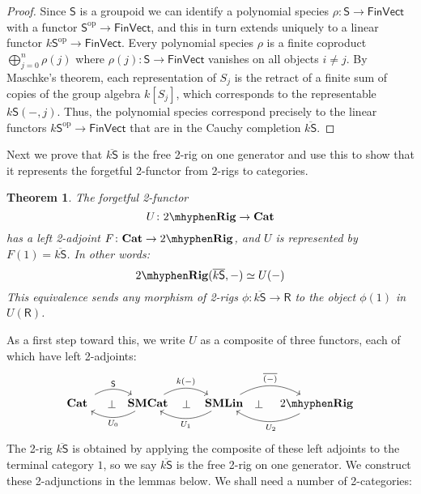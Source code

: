 \documentclass[12pt,reqno]{amsart}
\theoremstyle{plain}
\newtheorem{thm}{Theorem}
\theoremstyle{definition}
\theoremstyle{remark}
\newcommand{\maps}{\colon}
\newcommand{\op}{^\mathrm{op}}
\newcommand{\category}[1]{\mathsf{#1}}
\newcommand{\R}{\category R}
\renewcommand{\S}{\category S}
\newcommand{\namedcat}[1]{\mathsf{#1}}
\newcommand{\SMC}{\namedbicat{SMCat}}
\newcommand{\SMLin}{\namedbicat{SMLin}}
\newcommand{\TRig}{2\mhyphen\namedbicat{Rig}}
\newcommand{\Vect}{\namedcat{Vect}}
\newcommand{\Fin}{\namedcat{Fin}}
\newcommand{\namedbicat}[1]{\mathbf{#1}}
\newcommand{\CCat}{\namedbicat{Cat}}
\newcommand{\ksbar}{\overline{k\S}}
\numberwithin{thm}{section}
\begin{document}
\begin{proof}
    Since $\S$ is a groupoid we can identify a polynomial species $\rho \maps \S \to \Fin\Vect$ with a functor $\S\op \to \Fin\Vect$, and this in turn extends uniquely to a linear functor $k\S\op \to \Fin\Vect$. Every polynomial species $\rho$ is a finite coproduct $\bigoplus_{j = 0}^n \rho(j)$ where $\rho(j) \maps \S \to \Fin\Vect$ vanishes on all objects $i \ne j$. By Maschke's theorem, each representation of $S_j$ is the retract of a finite sum of copies of the group algebra $k[S_j]$, which corresponds to the representable $k\S(-, j)$. Thus, the polynomial species correspond precisely to the linear functors $k\S\op \to \Fin\Vect$ that are in the Cauchy completion $\ksbar$.
\end{proof}

Next we prove that $\ksbar$ is the free 2-rig on one generator and use this to show that it represents the forgetful 2-functor from 2-rigs to categories.

\begin{thm}
\label{thm:representing_U}
    The forgetful 2-functor 
    \[
        U \maps \TRig \to \CCat
    \] 
    has a left 2-adjoint $F \maps \CCat \to \TRig$, and $U$ is represented by $F(1) = \overline{k \S}$. In other words:
    \[   
        \TRig(\overline{k \S}, -) \simeq U(-)
    \] 
    This equivalence sends any morphism of 2-rigs $\phi \maps \ksbar \to \R$ to the object $\phi(1)$ in $U(\R)$.
\end{thm}

As a first step toward this, we write $U$ as a composite of three functors, each of which have left 2-adjoints:
\[
\begin{tikzcd}
    \CCat \phantom{\;}
    \arrow[r, bend left, "\S"]
    \arrow[r, phantom, "\bot", pos = 0.6]
    &
    \SMC
    \arrow[l, bend left, "U_0"]
    \arrow[r, bend left, "k(-)"]
    \arrow[r, phantom, "\bot"]
    &
    \SMLin
    \arrow[l, bend left, "U_1"]
    \arrow[r, bend left, "\overline{(-)}"]
    \arrow[r, phantom, "\bot", pos = 0.4]
    &
    \TRig
    \arrow[l, bend left, "U_2", pos = 0.45]
\end{tikzcd}
\]
The 2-rig $\ksbar$ is obtained by applying the composite of these left adjoints to the terminal category $1$, so we say $\ksbar$ is the free 2-rig on one generator. We construct these 2-adjunctions in the lemmas below. We shall need a number of 2-categories:
\end{document}
